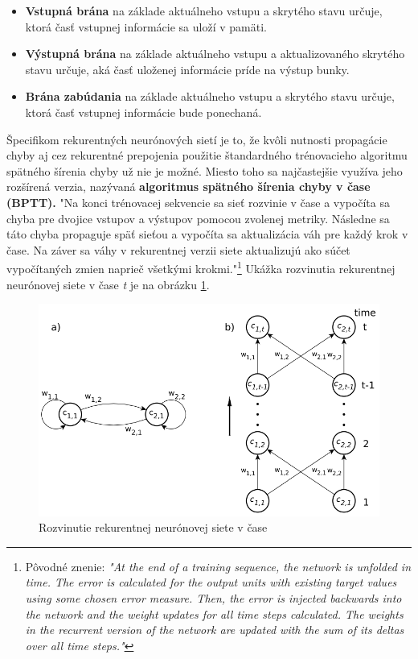 \begin{itemize}
    \item \textbf{Vstupná brána} na základe aktuálneho vstupu a skrytého stavu určuje, ktorá časť vstupnej informácie sa uloží v pamäti.
    \item \textbf{Výstupná brána} na základe aktuálneho vstupu a aktualizovaného skrytého stavu určuje, aká časť uloženej informácie príde na výstup bunky.
    \item \textbf{Brána zabúdania} na základe aktuálneho vstupu a skrytého stavu určuje, ktorá časť vstupnej informácie bude ponechaná.\cite{Yu2019}
\end{itemize}

Špecifikom rekurentných neurónových sietí je to, že kvôli nutnosti propagácie chyby aj cez rekurentné prepojenia použitie štandardného trénovacieho algoritmu spätného šírenia chyby už nie je možné. Miesto toho sa najčastejšie využíva jeho rozšírená verzia, nazývaná \textbf{algoritmus spätného šírenia chyby v čase (BPTT).} "Na konci trénovacej sekvencie sa sieť rozvinie v čase a vypočíta sa chyba pre dvojice vstupov a výstupov pomocou zvolenej metriky. Následne sa táto chyba propaguje späť sieťou a vypočíta sa aktualizácia váh pre každý krok v čase. Na záver sa váhy v rekurentnej verzii siete aktualizujú ako súčet vypočítaných zmien naprieč všetkými krokmi."\footnote{Pôvodné znenie: \textit{"At the end of a training sequence, the network is unfolded in time. The error is calculated for the output units with existing target values using some chosen error measure. Then, the error is injected backwards into the network and the weight updates for all time steps calculated. The weights in the recurrent version of the network are updated with the sum of its deltas over all time steps."}}\cite{Yu2019} Ukážka rozvinutia rekurentnej neurónovej siete v čase \textit{t} je na obrázku \ref{fig:backpropagation}.

\begin{figure}[H]
    \centering
    \includegraphics[scale=0.7]{img/backpropagation.png}
    \caption{Rozvinutie rekurentnej neurónovej siete v čase\cite{Yu2019}}
    \label{fig:backpropagation}
\end{figure}


